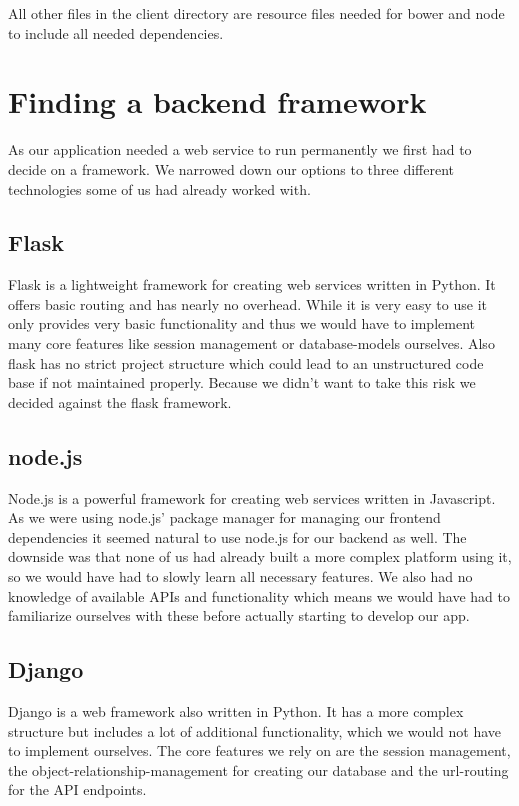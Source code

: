 All other files in the client directory are resource files needed for
bower and node to include all needed dependencies.

\newpage
\newpage
\section{Finding a backend framework}\label{finding-a-backend-framework}

As our application needed a web service to run permanently we first had
to decide on a framework. We narrowed down our options to three
different technologies some of us had already worked with.

\subsection{Flask}\label{flask}

Flask is a lightweight framework for creating web services written in
Python. It offers basic routing and has nearly no overhead. While it is
very easy to use it only provides very basic functionality and thus we
would have to implement many core features like session management or
database-models ourselves. Also flask has no strict project structure
which could lead to an unstructured code base if not maintained
properly. Because we didn't want to take this risk we decided against
the flask framework.

\subsection{node.js}\label{node.js}

Node.js is a powerful framework for creating web services written in
Javascript. As we were using node.js' package manager for managing our
frontend dependencies it seemed natural to use node.js for our backend
as well. The downside was that none of us had already built a more
complex platform using it, so we would have had to slowly learn all
necessary features. We also had no knowledge of available APIs and
functionality which means we would have had to familiarize ourselves
with these before actually starting to develop our app.

\subsection{Django}\label{django}

Django is a web framework also written in Python. It has a more complex
structure but includes a lot of additional functionality, which we would
not have to implement ourselves. The core features we rely on are the
session management, the object-relationship-management for creating our
database and the url-routing for the API endpoints.

